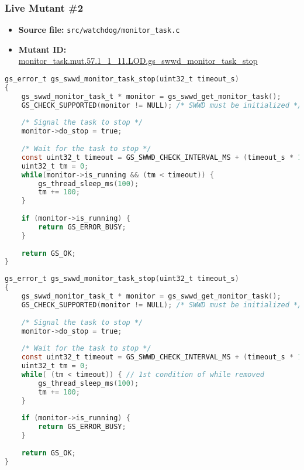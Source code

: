 \subsubsection{Live Mutant \#2}

\begin{itemize}
\item \textbf{Source file:} \texttt{src/watchdog/monitor\_task.c}
\item \textbf{Mutant ID:} \url{monitor_task.mut.57.1_1_11.LOD.gs_swwd_monitor_task_stop}
\end{itemize}

\begin{lstlisting}[language=C, label=live_2, caption=Original source code.]
gs_error_t gs_swwd_monitor_task_stop(uint32_t timeout_s)
{
    gs_swwd_monitor_task_t * monitor = gs_swwd_get_monitor_task();
    GS_CHECK_SUPPORTED(monitor != NULL); /* SWWD must be initialized */
 
    /* Signal the task to stop */
    monitor->do_stop = true;
 
    /* Wait for the task to stop */                                                                                                  
    const uint32_t timeout = GS_SWWD_CHECK_INTERVAL_MS + (timeout_s * 1000);
    uint32_t tm = 0;
    while(monitor->is_running && (tm < timeout)) {
        gs_thread_sleep_ms(100);
        tm += 100;
    }
 
    if (monitor->is_running) {
        return GS_ERROR_BUSY;
    }
 
    return GS_OK;
}
\end{lstlisting}

\begin{lstlisting}[language=C, label=live_2, caption=Mutant source code.]
gs_error_t gs_swwd_monitor_task_stop(uint32_t timeout_s)
{
    gs_swwd_monitor_task_t * monitor = gs_swwd_get_monitor_task();
    GS_CHECK_SUPPORTED(monitor != NULL); /* SWWD must be initialized */
 
    /* Signal the task to stop */
    monitor->do_stop = true;
 
    /* Wait for the task to stop */                                                                                                  
    const uint32_t timeout = GS_SWWD_CHECK_INTERVAL_MS + (timeout_s * 1000);
    uint32_t tm = 0;
    while( (tm < timeout)) { // 1st condition of while removed
        gs_thread_sleep_ms(100);
        tm += 100;
    }
 
    if (monitor->is_running) {
        return GS_ERROR_BUSY;
    }
 
    return GS_OK;
}
\end{lstlisting}


